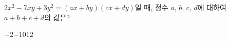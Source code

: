 $2x^2-7xy+3y^2=(ax+by)(cx+dy)$일 때, 정수 $a$, $b$, $c$, $d$에 대하여 $a+b+c+d$의 값은? 
\begin{choices32}{$-2$}{$-1$}{$0$}{$1$}{$2$}\end{choices32}

